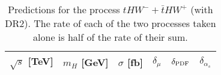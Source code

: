 \documentclass[a4paper,usenames,dvipsnames,11pt]{article}
\begin{document}
\begin{table}
    \centering
    \begin{tabular}{cccccc}
        $\sqrt{s}$ [TeV]  &  $m_H$ [GeV]  &  $\sigma$ [fb]  & $\delta_{\mu}$   &  $\delta_{\rm PDF}$   & $\delta_{\alpha_s}$\\
        \hline
          
    \end{tabular}
    \caption{\label{tab:thw-tot} Predictions for the process $tHW^- + \bar t HW^+$ (with DR2). The rate of each of the two processes taken alone is
half of the rate of their sum.}
\end{table}




\end{document}
